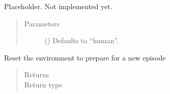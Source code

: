 \documentclass[letterpaper,10pt,english]{sphinxmanual}
\begin{document}
\begin{fulllineitems}
\begin{fulllineitems}
\begin{quote}
\begin{description}
\end{description}\end{quote}

\end{fulllineitems}


\begin{fulllineitems}
\label{\detokenize{CryptoEnv:crypto_env.core.CryptoEnv.render}}
\sphinxAtStartPar
Placeholder. Not implemented yet.
\begin{quote}\begin{description}
\item[{Parameters}] \leavevmode
\sphinxAtStartPar
{} (\sphinxstyleliteralemphasis{\sphinxupquote{, }}) \textendash{} Defaults to “human”.

\end{description}\end{quote}

\end{fulllineitems}


\begin{fulllineitems}
\label{\detokenize{CryptoEnv:crypto_env.core.CryptoEnv.reset}}
\sphinxAtStartPar
Reset the environment to prepare for a new episode
\begin{quote}\begin{description}
\item[{Returns}] \leavevmode
\sphinxAtStartPar


\item[{Return type}] \leavevmode
\sphinxAtStartPar
{\hyperref[\detokenize{CryptoEnv:crypto_env.core.CryptoEnv}]{}}

\end{description}\end{quote}

\end{fulllineitems}


\end{fulllineitems}
\end{document}
